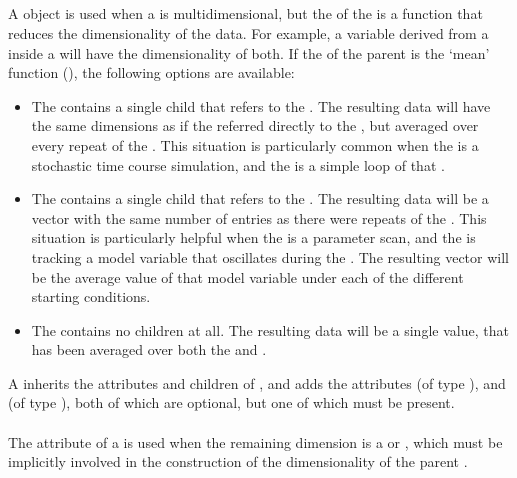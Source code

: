 \begin{blockChanged}
\subsection{}
\label{class:remainingDimension}
\label{class:listOfRemainingDimensions}

A \RemainingDimension object is used when a \Variable is multidimensional, but the  of the \Variable is a function that reduces the dimensionality of the data.  For example, a variable derived from a \Task inside a \RepeatedTask will have the dimensionality of both.  If the  of the parent \Variable is the `mean' function (), the following options are available:

\begin{itemize}
        \item The \Variable contains a single \RemainingDimension child that refers to the \Task.  The resulting data will have the same dimensions as if the \Variable referred directly to the \Task, but averaged over every repeat of the \RepeatedTask.  This situation is particularly common when the \Task is a stochastic time course simulation, and the \RepeatedTask is a simple loop of that \Task.
        \item The \Variable contains a single \RemainingDimension child that refers to the \RepeatedTask.  The resulting data will be a vector with the same number of entries as there were repeats of the \RepeatedTask.  This situation is particularly helpful when the \RepeatedTask is a parameter scan, and the \Variable is tracking a model variable that oscillates during the \Task.  The resulting vector will be the average value of that model variable under each of the different starting conditions.
        \item The \Variable contains no \RemainingDimension children at all.  The resulting data will be a single value, that has been averaged over both the \Task and \RepeatedTask.
\end{itemize}

A \RemainingDimension inherits the attributes and children of \SedBase, and adds the attributes  (of type \SIdRef), and  (of type ), both of which are optional, but one of which must be present.

\paragraph*{}
The  attribute of a \RemainingDimension is used when the remaining dimension is a \Task or \RepeatedTask, which must be implicitly involved in the construction of the dimensionality of the parent \Variable.


\end{blockChanged}
